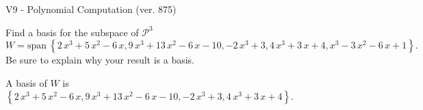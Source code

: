 \begin{exercise}
  \begin{exerciseTitle}V9 - Polynomial Computation (ver. 875)\end{exerciseTitle}
  \begin{exerciseStatement}
    Find a basis for the subspace of \(\mathcal{P}^3\) 
\[W=\mathrm{span}\ \left\{2 \, x^{3} + 5 \, x^{2} - 6 \, x , 9 \, x^{3} + 13 \, x^{2} - 6 \, x - 10 , -2 \, x^{3} + 3 , 4 \, x^{3} + 3 \, x + 4 , x^{3} - 3 \, x^{2} - 6 \, x + 1\right\}.\]
 Be sure to explain why your result is a basis.


  \end{exerciseStatement}
  \begin{exerciseAnswer}
   A basis of \(W\) is  \(\left\{2 \, x^{3} + 5 \, x^{2} - 6 \, x , 9 \, x^{3} + 13 \, x^{2} - 6 \, x - 10 , -2 \, x^{3} + 3 , 4 \, x^{3} + 3 \, x + 4\right\}\).
  


  \end{exerciseAnswer}
\end{exercise}